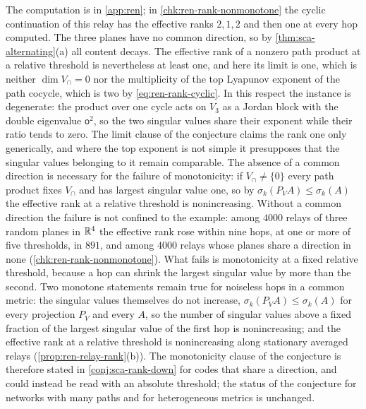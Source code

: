 The computation is in \cref{app:ren}; in \cref{chk:ren-rank-nonmonotone} the cyclic continuation of this relay has the effective ranks $2,1,2$ and then one at every hop computed. The three planes have no common direction, so by \cref{thm:sca-alternating}(a) all content decays. The effective rank of a nonzero path product at a relative threshold is nevertheless at least one, and here its limit is one, which is neither $\dim V_\cap=0$ nor the multiplicity of the top Lyapunov exponent of the path cocycle, which is two by \eqref{eq:ren-rank-cyclic}. In this respect the instance is degenerate: the product over one cycle acts on $V_3$ as a Jordan block with the double eigenvalue $\mathsf o^2$, so the two singular values share their exponent while their ratio tends to zero. The limit clause of the conjecture claims the rank one only generically, and where the top exponent is not simple it presupposes that the singular values belonging to it remain comparable. The absence of a common direction is necessary for the failure of monotonicity: if $V_\cap\neq\{0\}$ every path product fixes $V_\cap$ and has largest singular value one, so by $\sigma_k(P_VA)\le\sigma_k(A)$ the effective rank at a relative threshold is nonincreasing. Without a common direction the failure is not confined to the example: among $4000$ relays of three random planes in $\mathbb{R}^4$ the effective rank rose within nine hops, at one or more of five thresholds, in $891$, and among $4000$ relays whose planes share a direction in none (\cref{chk:ren-rank-nonmonotone}). What fails is monotonicity at a fixed relative threshold, because a hop can shrink the largest singular value by more than the second. Two monotone statements remain true for noiseless hops in a common metric: the singular values themselves do not increase, $\sigma_k(P_VA)\le\sigma_k(A)$ for every projection $P_V$ and every $A$, so the number of singular values above a fixed fraction of the largest singular value of the first hop is nonincreasing; and the effective rank at a relative threshold is nonincreasing along stationary averaged relays (\cref{prop:ren-relay-rank}(b)). The monotonicity clause of the conjecture is therefore stated in \cref{conj:sca-rank-down} for codes that share a direction, and could instead be read with an absolute threshold; the status of the conjecture for networks with many paths and for heterogeneous metrics is unchanged.

